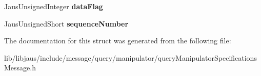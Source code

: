 \begin{DoxyCompactItemize}
\item 
\hypertarget{struct_query_manipulator_specifications_message_struct_ac6383f1041574771393482529fcc3fed}{\-Jaus\-Unsigned\-Integer {\bfseries data\-Flag}}\label{struct_query_manipulator_specifications_message_struct_ac6383f1041574771393482529fcc3fed}

\item 
\hypertarget{struct_query_manipulator_specifications_message_struct_a914a8555d6cbc5fda241c4db69b2bce3}{\-Jaus\-Unsigned\-Short {\bfseries sequence\-Number}}\label{struct_query_manipulator_specifications_message_struct_a914a8555d6cbc5fda241c4db69b2bce3}

\end{DoxyCompactItemize}


\-The documentation for this struct was generated from the following file\-:\begin{DoxyCompactItemize}
\item 
lib/libjaus/include/message/query/manipulator/query\-Manipulator\-Specifications\-Message.\-h\end{DoxyCompactItemize}
